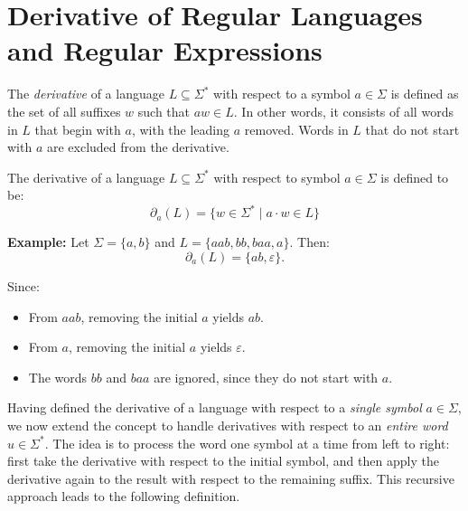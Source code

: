 \section{Derivative of Regular Languages and Regular Expressions}\label{sec:derivatives}
The \emph{derivative} of a language \(L \subseteq \Sigma^*\) with respect to a symbol \(a \in \Sigma\) is defined as the set of all suffixes \(w\) such that \(aw \in L\). In other words, it consists of all words in \(L\) that begin with \(a\), with the leading \(a\) removed. Words in \(L\) that do not start with \(a\) are excluded from the derivative.

\begin{definition}\label{def:derivative}
    The derivative of a language $L \subseteq \Sigma^*$ with respect to symbol $a \in \Sigma$ is defined to be:
    $$
        \partial_a(L)=\{ w \in \Sigma^* \mid a \cdot w \in L \}
    $$

    \textbf{Example:} Let $\Sigma = \{a, b\}$ and $L = \{aab, bb, baa, a\}$. Then:
    \[
        \partial_a(L) = \{ab, \varepsilon \}.
    \] 
    
    Since: \begin{itemize}
        \item From $aab$, removing the initial $a$ yields $ab$.
        \item From $a$, removing the initial $a$ yields $\varepsilon$.
        \item The words $bb$ and $baa$ are ignored, since they do not start with $a$.
    \end{itemize}
\end{definition}



\noindent
Having defined the derivative of a language with respect to a \emph{single symbol} 
$a \in \Sigma$, we now extend the concept to handle derivatives with respect to an 
\emph{entire word} $u \in \Sigma^*$. 
The idea is to process the word one symbol at a time from left to right: 
first take the derivative with respect to the initial symbol, and then apply 
the derivative again to the result with respect to the remaining suffix. 
This recursive approach leads to the following definition.


